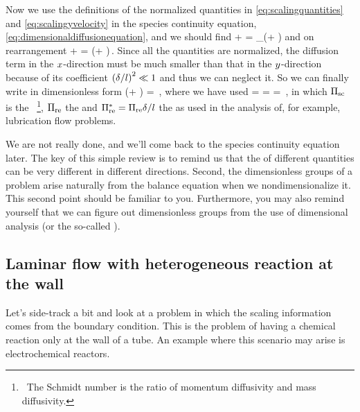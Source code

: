 Now we use the definitions of the normalized quantities in \cref{eq:scalingquantities} and \cref{eq:scalingyvelocity} in the species continuity equation, \cref{eq:dimensionaldiffusionequation}, and we should find
\beq
\dfrac{\fsvel}{\length}\ndvelx\xpd\ndconc\ndposx + \dfrac{\fsvel\blthck}{\blthck\length}\ndvely\xpd\conc\ndposy =
\kmdiff_\left(\conc\ndposx + \conc\ndposy\right)
\eeq
and on rearrangement
\beq
\ndvelx\xpd\conc\ndposx + \ndvely\xpd\conc\ndposy =
\left(\conc\ndposx + \conc\ndposy\right)\,.
\eeq
Since all the quantities are normalized, the diffusion term in the $x$-direction must be much smaller than that in the $y$-direction because of its coefficient $\left(\delta/l\right)^2\ll 1$ and thus we can neglect it. So we can finally write in dimensionless form
\bneq\label{eq:dimlessspeciescontinuity}
\kschmidt\kredrey\left(\ndvelx\cder\conc\ndposx + \ndvely\cder\conc\ndposy\right) = \cder\conc{\ndposy\ndposy}\,,
\eneq
where we have used
\beq
{} = 
\dfrac{\kvisc}{\fsvel\blthck}\dfrac{\length}{\blthck} =
\dfrac{\length}{\blthck} = 
\,,
\eeq
in which $\Pi_\text{sc}$ is the ~\footnote{~The Schmidt number is the ratio of momentum diffusivity and mass diffusivity.}, $\Pi_\text{re}$ the  and $\Pi^*_\text{re} = \Pi_\text{re}\delta/l$ the  as used in the analysis of, for example, lubrication flow problems.

We are not really done, and we'll come back to the species continuity equation later. The key of this simple review is to remind us that the  of different quantities can be very different in different directions. Second, the dimensionless groups of a problem arise naturally from the balance equation when we nondimensionalize it. This second point should be familiar to you. Furthermore, you may also remind yourself that we can figure out dimensionless groups from the use of dimensional analysis (or the so-called ).


\subsection{Laminar flow with heterogeneous reaction at the wall}
Let's side-track a bit and look at a problem in which the scaling information comes from the boundary condition. This is the problem of having a chemical reaction only at the wall of a tube. An example where this scenario may arise is electrochemical reactors.


